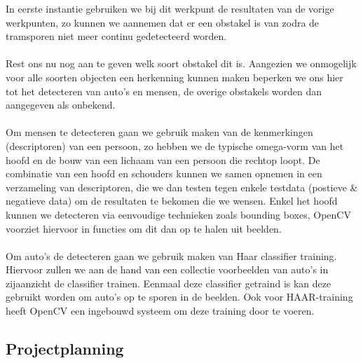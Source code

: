 \documentclass[a4paper,oneside,11pt,final]{memoir}
\begin{document}
In eerste instantie gebruiken we bij dit werkpunt de resultaten van de vorige werkpunten, zo kunnen we aannemen dat er een obstakel is van zodra de tramsporen niet meer continu gedetecteerd worden.
\\\\
Rest ons nu nog aan te geven welk soort obstakel dit is. Aangezien we onmogelijk voor alle soorten objecten een herkenning kunnen maken beperken we ons hier tot het detecteren van auto's en mensen, de overige obstakels worden dan aangegeven als onbekend.
\\\\
Om mensen te detecteren gaan we gebruik maken van de kenmerkingen (descriptoren) van een persoon, zo hebben we de typische omega-vorm van het hoofd en de  bouw van een lichaam van een persoon die rechtop loopt. De combinatie van een hoofd en schouders kunnen we samen opnemen in een verzameling van descriptoren, die we dan testen tegen enkele testdata (postieve \& negatieve data) om de resultaten te bekomen die we wensen. Enkel het hoofd kunnen we detecteren via eenvoudige technieken zoals bounding boxes, OpenCV voorziet hiervoor in functies om dit dan op te halen uit beelden.
\\\\
Om auto's de detecteren gaan we gebruik maken van Haar classifier training. Hiervoor zullen we aan de hand van een collectie voorbeelden van auto's in zijaanzicht de classifier trainen. Eenmaal deze classifier getraind is kan deze gebruikt worden om auto's op te sporen in de beelden. Ook voor HAAR-training heeft OpenCV een ingebouwd systeem om deze training door te voeren.

\subsection{Projectplanning}\label{sec:Projectplanning}

\end{document}
